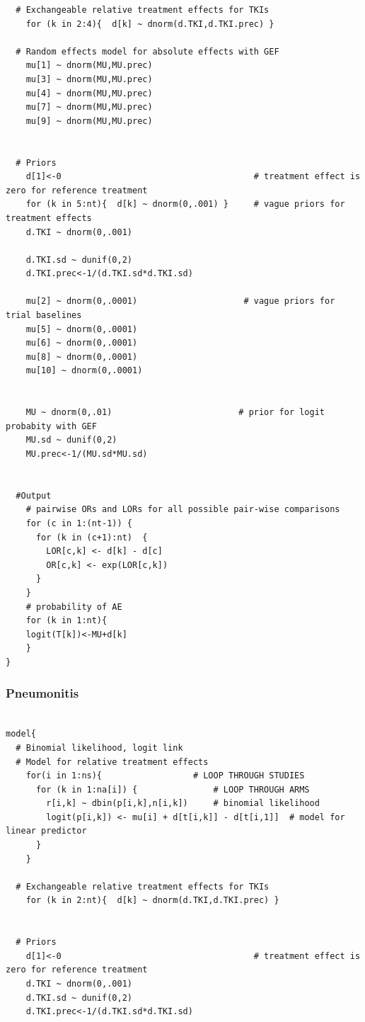 \documentclass[11pt,final,fleqn]{article}\usepackage[]{graphicx}\usepackage[]{color}
\theoremstyle{plain}
\begin{document}
\begin{appendices}
\begin{verbatim}
  # Exchangeable relative treatment effects for TKIs
    for (k in 2:4){  d[k] ~ dnorm(d.TKI,d.TKI.prec) }
  
  # Random effects model for absolute effects with GEF
    mu[1] ~ dnorm(MU,MU.prec) 
    mu[3] ~ dnorm(MU,MU.prec)
    mu[4] ~ dnorm(MU,MU.prec)
    mu[7] ~ dnorm(MU,MU.prec) 
    mu[9] ~ dnorm(MU,MU.prec) 
       
       
  # Priors
    d[1]<-0                                      # treatment effect is zero for reference treatment
    for (k in 5:nt){  d[k] ~ dnorm(0,.001) }     # vague priors for treatment effects
    d.TKI ~ dnorm(0,.001)
    
    d.TKI.sd ~ dunif(0,2) 
    d.TKI.prec<-1/(d.TKI.sd*d.TKI.sd)
    
    mu[2] ~ dnorm(0,.0001)                     # vague priors for trial baselines
    mu[5] ~ dnorm(0,.0001)
    mu[6] ~ dnorm(0,.0001)
    mu[8] ~ dnorm(0,.0001)
    mu[10] ~ dnorm(0,.0001)
                     
      
    MU ~ dnorm(0,.01)                         # prior for logit probabity with GEF
    MU.sd ~ dunif(0,2) 
    MU.prec<-1/(MU.sd*MU.sd)
    
      
  #Output 
    # pairwise ORs and LORs for all possible pair-wise comparisons                                       
    for (c in 1:(nt-1)) {                        
      for (k in (c+1):nt)  { 
        LOR[c,k] <- d[k] - d[c]
        OR[c,k] <- exp(LOR[c,k])
      }  
    }
    # probability of AE
    for (k in 1:nt){ 
    logit(T[k])<-MU+d[k]
    }
}

\end{verbatim}

\subsubsection{Pneumonitis} 
\begin{verbatim} 

model{
  # Binomial likelihood, logit link
  # Model for relative treatment effects
    for(i in 1:ns){                  # LOOP THROUGH STUDIES
      for (k in 1:na[i]) {               # LOOP THROUGH ARMS
        r[i,k] ~ dbin(p[i,k],n[i,k])     # binomial likelihood
        logit(p[i,k]) <- mu[i] + d[t[i,k]] - d[t[i,1]]  # model for linear predictor
      }
    }   
  
  # Exchangeable relative treatment effects for TKIs
    for (k in 2:nt){  d[k] ~ dnorm(d.TKI,d.TKI.prec) }
  
       
  # Priors
    d[1]<-0                                      # treatment effect is zero for reference treatment
    d.TKI ~ dnorm(0,.001)
    d.TKI.sd ~ dunif(0,2) 
    d.TKI.prec<-1/(d.TKI.sd*d.TKI.sd)
      

\end{verbatim}
\end{appendices}
\end{document}

